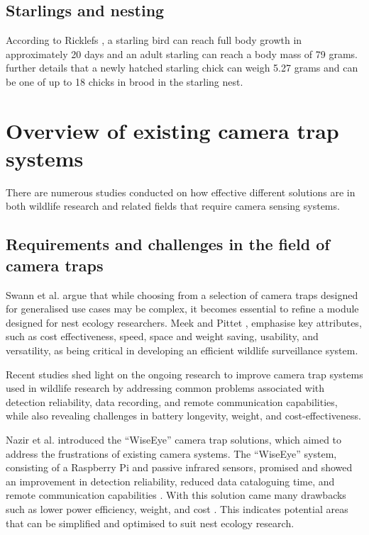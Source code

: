 \documentclass[class=report,11pt,crop=false]{standalone}
\begin{document}
\subsection{Starlings and nesting}

According to Ricklefs \cite{ricklefs1968patterns}, a starling bird can reach full body growth in approximately 20 days and an adult starling can reach a body mass of 79 grams. \cite{ricklefs1968patterns} further details that a newly hatched starling chick can weigh 5.27 grams and can be one of up to 18 chicks in brood in the starling nest. 



\section{Overview of existing camera trap systems}

There are numerous studies conducted on how effective different solutions are in both wildlife research and related fields that require camera sensing systems. 

\subsection{Requirements and challenges in the field of camera traps}

Swann et al. \cite{swann2011evaluating} argue that while choosing from a selection of camera traps designed for generalised use cases may be complex, it becomes essential to refine a module designed for nest ecology researchers. Meek and Pittet \cite{meek2012user}, emphasise key attributes, such as cost effectiveness, speed, space and weight saving, usability, and versatility, as being critical in developing an efficient wildlife surveillance system.  

Recent studies shed light on the ongoing research to improve camera trap systems used in wildlife research by addressing common problems associated with detection reliability, data recording, and remote communication capabilities, while also revealing challenges in battery longevity, weight, and cost-effectiveness. 

Nazir et al. \cite{nazir2017wiseeye} introduced the “WiseEye” camera trap solutions, which aimed to address the frustrations of existing camera systems. The “WiseEye” system, consisting of a Raspberry Pi and passive infrared sensors, promised and showed an improvement in detection reliability, reduced data cataloguing time, and remote communication capabilities \cite{nazir2017wiseeye}. With this solution came many drawbacks such as lower power efficiency, weight, and cost \cite{nazir2017wiseeye}. This indicates potential areas that can be simplified and optimised to suit nest ecology research.  
\end{document}
